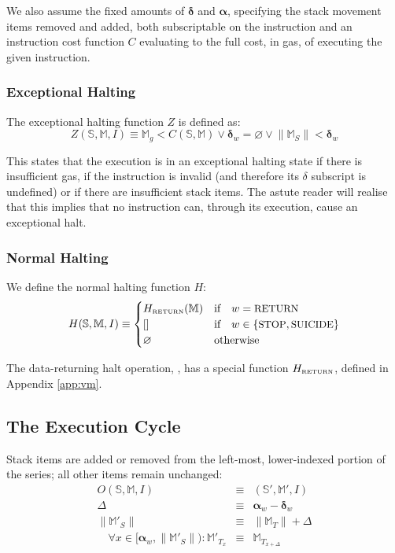 \documentclass[9pt,oneside]{amsart}
\begin{document}
\begin{multicols}{2}
We also assume the fixed amounts of $\mathbf{\delta}$ and $\mathbf{\alpha}$, specifying the stack movement items removed and added, both subscriptable on the instruction and an instruction cost function $C$ evaluating to the full cost, in gas, of executing the given instruction.

\subsubsection{Exceptional Halting}

The exceptional halting function $Z$ is defined as:
\begin{equation}
Z(\mathbb{S}, \mathbb{M}, I) \equiv \mathbb{M}_g < C(\mathbb{S}, \mathbb{M}) \vee \mathbf{\delta}_w = \varnothing \vee \lVert\mathbb{M}_S\rVert < \mathbf{\delta}_w
\end{equation}

This states that the execution is in an exceptional halting state if there is insufficient gas, if the instruction is invalid (and therefore its $\delta$ subscript is undefined) or if there are insufficient stack items. The astute reader will realise that this implies that no instruction can, through its execution, cause an exceptional halt.

\subsubsection{Normal Halting}

We define the normal halting function $H$:
\begin{equation}
H(\mathbb{S}, \mathbb{M}, I) \equiv \begin{cases}
H_{\text{\tiny RETURN}}(\mathbb{M}) & \text{if} \quad w = \text{\small RETURN} \\
[] & \text{if} \quad w \in \{ \text{\small STOP}, \text{\small SUICIDE} \} \\
\varnothing & \text{otherwise}
\end{cases}
\end{equation}

The data-returning halt operation, , has a special function $H_{\text{\tiny RETURN}}$, defined in Appendix \ref{app:vm}.

\subsection{The Execution Cycle}

Stack items are added or removed from the left-most, lower-indexed portion of the series; all other items remain unchanged:
\begin{eqnarray}
O(\mathbb{S}, \mathbb{M}, I) & \equiv & (\mathbb{S}', \mathbb{M}', I) \\
\Delta & \equiv & \mathbf{\alpha}_w - \mathbf{\delta}_w \\
\lVert\mathbb{M}'_{S}\rVert & \equiv & \lVert\mathbb{M}_{T}\rVert + \Delta \\
\quad \forall x \in [\mathbf{\alpha}_w, \lVert\mathbb{M}'_S\rVert): \mathbb{M}'_{T_x} & \equiv & \mathbb{M}_{T_{x+\Delta}}
\end{eqnarray}


\end{multicols}
\end{document}
